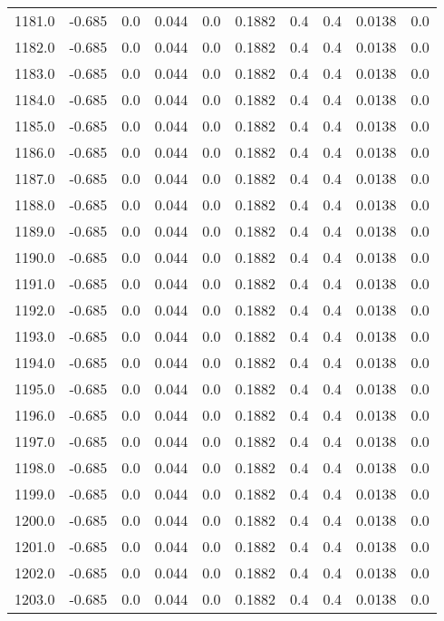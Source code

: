 \begin{longtable}{lrrrrrrrrr}
1181.0 & -0.685 & 0.0 & 0.044 & 0.0 & 0.1882 & 0.4 & 0.4 & 0.0138 & 0.0 \\
1182.0 & -0.685 & 0.0 & 0.044 & 0.0 & 0.1882 & 0.4 & 0.4 & 0.0138 & 0.0 \\
1183.0 & -0.685 & 0.0 & 0.044 & 0.0 & 0.1882 & 0.4 & 0.4 & 0.0138 & 0.0 \\
1184.0 & -0.685 & 0.0 & 0.044 & 0.0 & 0.1882 & 0.4 & 0.4 & 0.0138 & 0.0 \\
1185.0 & -0.685 & 0.0 & 0.044 & 0.0 & 0.1882 & 0.4 & 0.4 & 0.0138 & 0.0 \\
1186.0 & -0.685 & 0.0 & 0.044 & 0.0 & 0.1882 & 0.4 & 0.4 & 0.0138 & 0.0 \\
1187.0 & -0.685 & 0.0 & 0.044 & 0.0 & 0.1882 & 0.4 & 0.4 & 0.0138 & 0.0 \\
1188.0 & -0.685 & 0.0 & 0.044 & 0.0 & 0.1882 & 0.4 & 0.4 & 0.0138 & 0.0 \\
1189.0 & -0.685 & 0.0 & 0.044 & 0.0 & 0.1882 & 0.4 & 0.4 & 0.0138 & 0.0 \\
1190.0 & -0.685 & 0.0 & 0.044 & 0.0 & 0.1882 & 0.4 & 0.4 & 0.0138 & 0.0 \\
1191.0 & -0.685 & 0.0 & 0.044 & 0.0 & 0.1882 & 0.4 & 0.4 & 0.0138 & 0.0 \\
1192.0 & -0.685 & 0.0 & 0.044 & 0.0 & 0.1882 & 0.4 & 0.4 & 0.0138 & 0.0 \\
1193.0 & -0.685 & 0.0 & 0.044 & 0.0 & 0.1882 & 0.4 & 0.4 & 0.0138 & 0.0 \\
1194.0 & -0.685 & 0.0 & 0.044 & 0.0 & 0.1882 & 0.4 & 0.4 & 0.0138 & 0.0 \\
1195.0 & -0.685 & 0.0 & 0.044 & 0.0 & 0.1882 & 0.4 & 0.4 & 0.0138 & 0.0 \\
1196.0 & -0.685 & 0.0 & 0.044 & 0.0 & 0.1882 & 0.4 & 0.4 & 0.0138 & 0.0 \\
1197.0 & -0.685 & 0.0 & 0.044 & 0.0 & 0.1882 & 0.4 & 0.4 & 0.0138 & 0.0 \\
1198.0 & -0.685 & 0.0 & 0.044 & 0.0 & 0.1882 & 0.4 & 0.4 & 0.0138 & 0.0 \\
1199.0 & -0.685 & 0.0 & 0.044 & 0.0 & 0.1882 & 0.4 & 0.4 & 0.0138 & 0.0 \\
1200.0 & -0.685 & 0.0 & 0.044 & 0.0 & 0.1882 & 0.4 & 0.4 & 0.0138 & 0.0 \\
1201.0 & -0.685 & 0.0 & 0.044 & 0.0 & 0.1882 & 0.4 & 0.4 & 0.0138 & 0.0 \\
1202.0 & -0.685 & 0.0 & 0.044 & 0.0 & 0.1882 & 0.4 & 0.4 & 0.0138 & 0.0 \\
1203.0 & -0.685 & 0.0 & 0.044 & 0.0 & 0.1882 & 0.4 & 0.4 & 0.0138 & 0.0 \\

\end{longtable}
